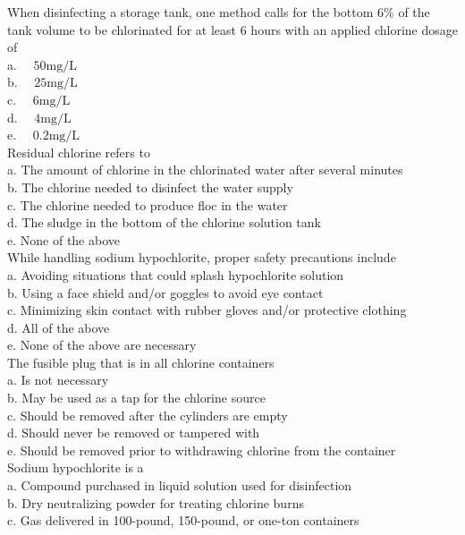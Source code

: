   When disinfecting a storage tank, one method calls for the bottom $6 \%$ of the tank volume to be chlorinated for at least 6 hours with an applied chlorine dosage of\\
a. $\quad 50 \mathrm{mg} / \mathrm{L}$\\
b. $\quad 25 \mathrm{mg} / \mathrm{L}$\\
c. $\quad 6 \mathrm{mg} / \mathrm{L}$\\
d. $\quad 4 \mathrm{mg} / \mathrm{L}$\\
e. $\quad 0.2 \mathrm{mg} / \mathrm{L}$ \\
Residual chlorine refers to\\
a. The amount of chlorine in the chlorinated water after several minutes\\
b. The chlorine needed to disinfect the water supply\\
c. The chlorine needed to produce floc in the water\\
d. The sludge in the bottom of the chlorine solution tank\\
e. None of the above\\
 While handling sodium hypochlorite, proper safety precautions include\\
a. Avoiding situations that could splash hypochlorite solution\\
b. Using a face shield and/or goggles to avoid eye contact\\
c. Minimizing skin contact with rubber gloves and/or protective clothing\\
d. All of the above\\
e. None of the above are necessary\\
  The fusible plug that is in all chlorine containers\\
a. Is not necessary\\
b. May be used as a tap for the chlorine source\\
c. Should be removed after the cylinders are empty\\
d. Should never be removed or tampered with\\
e. Should be removed prior to withdrawing chlorine from the container\\
 Sodium hypochlorite is a\\
a. Compound purchased in liquid solution used for disinfection\\
b. Dry neutralizing powder for treating chlorine burns\\
c. Gas delivered in 100-pound, 150-pound, or one-ton containers\\
